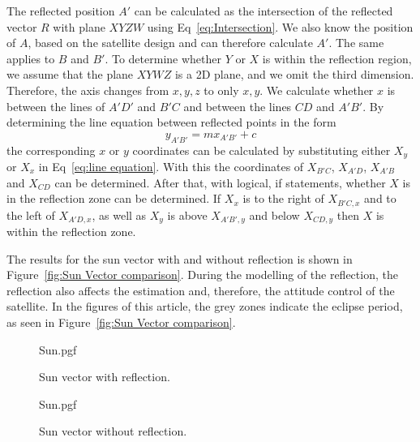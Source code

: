 \documentclass[letterpaper, 10 pt, conference]{ieeeconf}  %
\begin{document}
The reflected position $A'$ can be calculated as the intersection of the reflected vector $R$ with plane $XYZW$ using Eq~\ref{eq:Intersection}. We also know the position of $A$, based on the satellite design and can therefore calculate $A'$. The same applies to $B$ and $B'$. To determine whether $Y$ or $X$ is within the reflection region, we assume that the plane $XYWZ$ is a 2D plane, and we omit the third dimension. Therefore, the axis changes from $x, y, z$ to only $x, y$. We calculate whether $x$ is between the lines of $A'D'$ and $B'C$ and between the lines $CD$ and $A'B'$. By determining the line equation between reflected points in the form 
\begin{equation}
y_{A'B'} = mx_{A'B'} + c
\label{eq:line equation}
\end{equation}
the corresponding $x$ or $y$ coordinates can be calculated by substituting either $X_y$ or $X_x$ in Eq~\ref{eq:line equation}. With this the coordinates of $X_{B'C}$, $X_{A'D}$, $X_{A'B}$ and $X_{CD}$ can be determined. After that, with logical, if statements, whether $X$ is in the reflection zone can be determined. If $X_x$ is to the right of $X_{B'C,x}$ and to the left of $X_{A'D,x}$, as well as $X_y$ is above $X_{A'B',y}$ and below $X_{CD,y}$ then $X$ is within the reflection zone. 

The results for the sun vector with and without reflection is shown in Figure~\ref{fig:Sun Vector comparison}. During the modelling of the reflection, the reflection also affects the estimation and, therefore, the attitude control of the satellite. In the figures of this article, the grey zones indicate the eclipse period, as seen in Figure~\ref{fig:Sun Vector comparison}.

\begin{figure*}[!htb]
	\begin{subfigure}{.5\textwidth}
		\centering
		{Sun.pgf}
		\caption[Sun vector with reflection]{Sun vector with reflection.}
		\label{fig:Sun Vector comparison with reflection}
	\end{subfigure}
	\begin{subfigure}{.5\textwidth}
		\centering
		{Sun.pgf} 
		\caption[Sun vector without reflection]{Sun vector without reflection.}
		\label{fig:Sun Vector comparison without reflection}
	\end{subfigure}
	
	\caption{Comparison of Sun Vector with and without Reflection}
	\label{fig:Sun Vector comparison}
	
\end{figure*}
\end{document}
